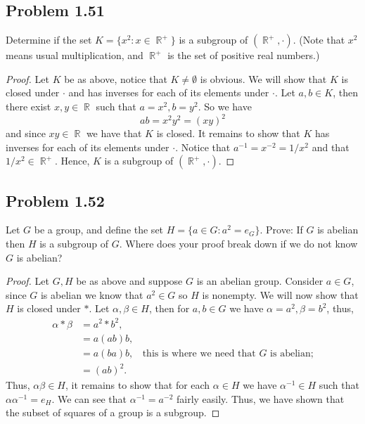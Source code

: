 \documentclass{amsbook}
\DeclareMathOperator{\R}{\mathbb{R}}
\begin{document}
			\subsection*{Problem 1.51}
			\label{sub:problem_1_51}
			Determine if the set $K = \{ x^{2} : x \in \R^{+} \}$ is a subgroup of $(\R^{+},\cdot)$. 
			(Note that $x^{2}$ means usual multiplication, and $\R^{+}$ is the set of positive real numbers.)
			\begin{proof} Let $K$ be as above, notice that $K \neq \emptyset$ is obvious.
			We will show that $K$ is closed under $\cdot$ and has inverses for each of its elements under $\cdot$.
			Let $a,b \in K$, then there exist $x,y \in \R$ such that $a = x^{2}, b = y^{2}$.
			So we have $$ab = x^{2}y^{2} = (xy)^{2}$$ and since $xy \in \R$ we have that $K$ is closed.
			It remains to show that $K$ has inverses for each of its elements under $\cdot$.
			Notice that $a^{-1} = x^{-2} = 1/x^{2}$ and that $1/x^{2} \in \R^{+}$.
			Hence, $K$ is a subgroup of $(\R^{+},\cdot)$.
			\end{proof}

			\subsection*{Problem 1.52}
			\label{sub:problem_1_52}
			Let $G$ be a group, and define the set $H = \{ a \in G : a^{2} = e_{G} \}$. 
			Prove: If $G$ is abelian then $H$ is a subgroup of $G$. 
			Where does your proof break down if we do not know $G$ is abelian?
			\begin{proof} Let $G,H$ be as above and suppose $G$ is an abelian group.
			Consider $a \in G$, since $G$ is abelian we know that $a^{2} \in G$ so $H$ is nonempty.
			We will now show that $H$ is closed under $*$.
			Let $\alpha,\beta \in H$, then for $a,b \in G$ we have $\alpha = a^{2}, \beta = b^{2}$, thus,
				\begin{align*}
					\alpha * \beta &= a^{2} * b^{2}, \\
					&= a(ab)b, \\
					&= a(ba)b, \ \ \ \ \text{this is where we need that $G$ is abelian;} \\
					&= (ab)^{2}.
				\end{align*}
			Thus, $\alpha\beta \in H$, it remains to show that for each $\alpha \in H$ we have $\alpha^{-1} \in H$ such that $\alpha \alpha^{-1} = e_{H}$.
			We can see that $\alpha^{-1} = a^{-2}$ fairly easily.
			Thus, we have shown that the subset of squares of a group is a subgroup.
			\end{proof}
\end{document}
